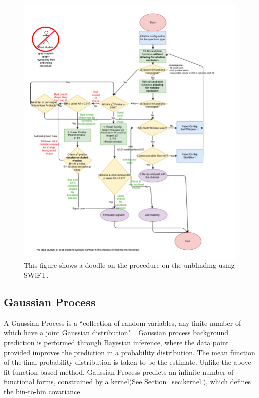 \begin{figure}[!htb] \begin{center}
        \includegraphics[width=1.05\textwidth]{figures/chapter_analysismethod/swift_unblindingflowchart}
        \caption{
            This figure shows a doodle on the procedure on the unblinding using SWiFT.
        }
        \label{fig:unblinding}
    \end{center}
\end{figure}
\FloatBarrier
    
    \subsection{Gaussian Process} 
    \label{sec:GP}

    A Gaussian Process is a ``collection of random variables, any finite number of which have a joint Gaussian distribution"~\cite{rasmussen2003gaussian}. Gaussian process background prediction is performed through Bayesian inference, where the data point provided improves the prediction in a probability distribution. The mean function of the final probability distribution is taken to be the estimate. Unlike the above fit function-based method, Gaussian Process predicts an infinite number of functional forms, constrained by a kernel(See Section~\ref{sec:kernel}), which defines the bin-to-bin covariance.

